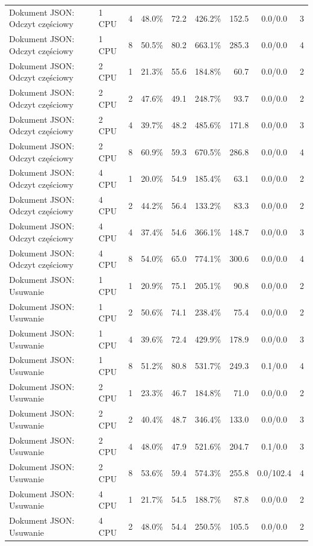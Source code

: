 \begin{table}[ht]
{\begin{tabular}{llcrrrrcc}
Dokument JSON: Odczyt częściowy & 1 CPU & 4 & 48.0\% & 72.2 & 426.2\% & 152.5 & 0.0/0.0 & 3 \\
Dokument JSON: Odczyt częściowy & 1 CPU & 8 & 50.5\% & 80.2 & 663.1\% & 285.3 & 0.0/0.0 & 4 \\
Dokument JSON: Odczyt częściowy & 2 CPU & 1 & 21.3\% & 55.6 & 184.8\% & 60.7 & 0.0/0.0 & 2 \\
Dokument JSON: Odczyt częściowy & 2 CPU & 2 & 47.6\% & 49.1 & 248.7\% & 93.7 & 0.0/0.0 & 2 \\
Dokument JSON: Odczyt częściowy & 2 CPU & 4 & 39.7\% & 48.2 & 485.6\% & 171.8 & 0.0/0.0 & 3 \\
Dokument JSON: Odczyt częściowy & 2 CPU & 8 & 60.9\% & 59.3 & 670.5\% & 286.8 & 0.0/0.0 & 4 \\
Dokument JSON: Odczyt częściowy & 4 CPU & 1 & 20.0\% & 54.9 & 185.4\% & 63.1 & 0.0/0.0 & 2 \\
Dokument JSON: Odczyt częściowy & 4 CPU & 2 & 44.2\% & 56.4 & 133.2\% & 83.3 & 0.0/0.0 & 2 \\
Dokument JSON: Odczyt częściowy & 4 CPU & 4 & 37.4\% & 54.6 & 366.1\% & 148.7 & 0.0/0.0 & 3 \\
Dokument JSON: Odczyt częściowy & 4 CPU & 8 & 54.0\% & 65.0 & 774.1\% & 300.6 & 0.0/0.0 & 4 \\
Dokument JSON: Usuwanie & 1 CPU & 1 & 20.9\% & 75.1 & 205.1\% & 90.8 & 0.0/0.0 & 2 \\
Dokument JSON: Usuwanie & 1 CPU & 2 & 50.6\% & 74.1 & 238.4\% & 75.4 & 0.0/0.0 & 2 \\
Dokument JSON: Usuwanie & 1 CPU & 4 & 39.6\% & 72.4 & 429.9\% & 178.9 & 0.0/0.0 & 3 \\
Dokument JSON: Usuwanie & 1 CPU & 8 & 51.2\% & 80.8 & 531.7\% & 249.3 & 0.1/0.0 & 4 \\
Dokument JSON: Usuwanie & 2 CPU & 1 & 23.3\% & 46.7 & 184.8\% & 71.0 & 0.0/0.0 & 2 \\
Dokument JSON: Usuwanie & 2 CPU & 2 & 40.4\% & 48.7 & 346.4\% & 133.0 & 0.0/0.0 & 3 \\
Dokument JSON: Usuwanie & 2 CPU & 4 & 48.0\% & 47.9 & 521.6\% & 204.7 & 0.1/0.0 & 3 \\
Dokument JSON: Usuwanie & 2 CPU & 8 & 53.6\% & 59.4 & 574.3\% & 255.8 & 0.0/102.4 & 4 \\
Dokument JSON: Usuwanie & 4 CPU & 1 & 21.7\% & 54.5 & 188.7\% & 87.8 & 0.0/0.0 & 2 \\
Dokument JSON: Usuwanie & 4 CPU & 2 & 48.0\% & 54.4 & 250.5\% & 105.5 & 0.0/0.0 & 2 \\

\end{tabular}}
\end{table}
